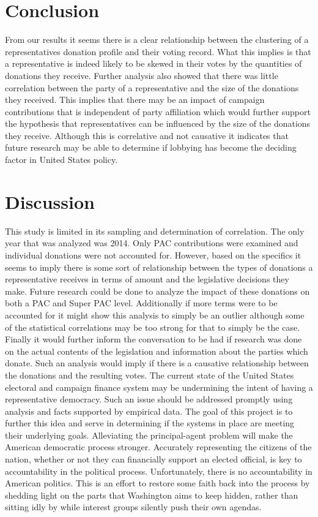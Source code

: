 \documentclass[journal]{IEEEtran}
\begin{document}
\section{Conclusion}
From our results it seems there is a clear relationship between the clustering of a representatives donation profile and their voting
record. What this implies is that a representative is indeed likely to be skewed in their votes by the quantities of donations they receive.
Further analysis also showed that there was little correlation between the party of a representative and the size of the donations they
received. This implies that there may be an impact of campaign contributions that is independent of party affiliation which would further
support the hypothesis that representatives can be influenced by the size of the donations they receive. Although this is correlative and
not causative it indicates that future research may be able to determine if lobbying has become the deciding factor in United States policy.
\section{Discussion}
This study is limited in its sampling and determination of correlation. The only year that was analyzed was 2014. Only PAC contributions were
examined and individual donations were not accounted for. However, based on the specifics it seems to imply there is some sort of relationship
between the types of donations a representative receives in terms of amount and the legislative decisions they make.
Future research could be done to analyze the impact of these donations on both a PAC and Super PAC level. Additionally if more terms 
were to be accounted for it might show this analysis to simply be an outlier although some of the statistical correlations may be too 
strong for that to simply be the case. Finally it would further inform the conversation to be had if research was done on the actual 
contents of the legislation and information about the parties which donate. Such an analysis would imply if there is a causative 
relationship between the donations and the resulting votes.
The current state of the United States electoral and campaign finance system may be undermining the intent of having a representative
democracy. Such an issue should be addressed promptly using analysis and facts supported by empirical data. The goal of this project
is to further this idea and serve in determining if the systems in place are meeting their underlying goals.
Alleviating the principal-agent problem will make the American democratic process stronger. Accurately representing the citizens 
of the nation, whether or not they can financially support an elected official, is key to accountability in the political process. 
Unfortunately, there is no accountability in American politics. This is an effort to restore some faith back into the process by 
shedding light on the parts that Washington aims to keep hidden, rather than sitting idly by while interest groups silently push 
their own agendas.
\end{document}
